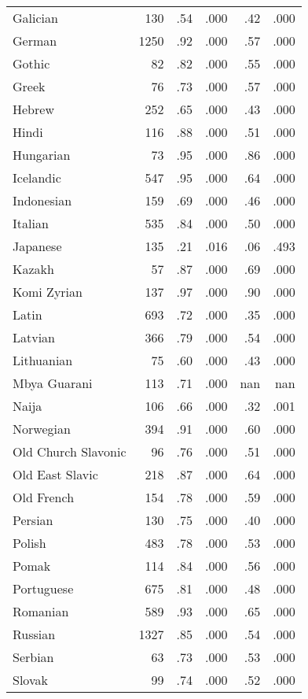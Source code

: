 \begin{longtable}{lrrrrr}
    Galician & 130 & .54 & .000 & .42 & .000 \\
    German & 1250 & .92 & .000 & .57 & .000 \\
    Gothic & 82 & .82 & .000 & .55 & .000 \\
    Greek & 76 & .73 & .000 & .57 & .000 \\
    Hebrew & 252 & .65 & .000 & .43 & .000 \\
    Hindi & 116 & .88 & .000 & .51 & .000 \\
    Hungarian & 73 & .95 & .000 & .86 & .000 \\
    Icelandic & 547 & .95 & .000 & .64 & .000 \\
    Indonesian & 159 & .69 & .000 & .46 & .000 \\
    Italian & 535 & .84 & .000 & .50 & .000 \\
    Japanese & 135 & .21 & .016 & .06 & .493 \\
    Kazakh & 57 & .87 & .000 & .69 & .000 \\
    Komi Zyrian & 137 & .97 & .000 & .90 & .000 \\
    Latin & 693 & .72 & .000 & .35 & .000 \\
    Latvian & 366 & .79 & .000 & .54 & .000 \\
    Lithuanian & 75 & .60 & .000 & .43 & .000 \\
    Mbya Guarani & 113 & .71 & .000 & nan & nan \\
    Naija & 106 & .66 & .000 & .32 & .001 \\
    Norwegian & 394 & .91 & .000 & .60 & .000 \\
    Old Church Slavonic & 96 & .76 & .000 & .51 & .000 \\
    Old East Slavic & 218 & .87 & .000 & .64 & .000 \\
    Old French & 154 & .78 & .000 & .59 & .000 \\
    Persian & 130 & .75 & .000 & .40 & .000 \\
    Polish & 483 & .78 & .000 & .53 & .000 \\
    Pomak & 114 & .84 & .000 & .56 & .000 \\
    Portuguese & 675 & .81 & .000 & .48 & .000 \\
    Romanian & 589 & .93 & .000 & .65 & .000 \\
    Russian & 1327 & .85 & .000 & .54 & .000 \\
    Serbian & 63 & .73 & .000 & .53 & .000 \\
    Slovak & 99 & .74 & .000 & .52 & .000 \\

\end{longtable}
